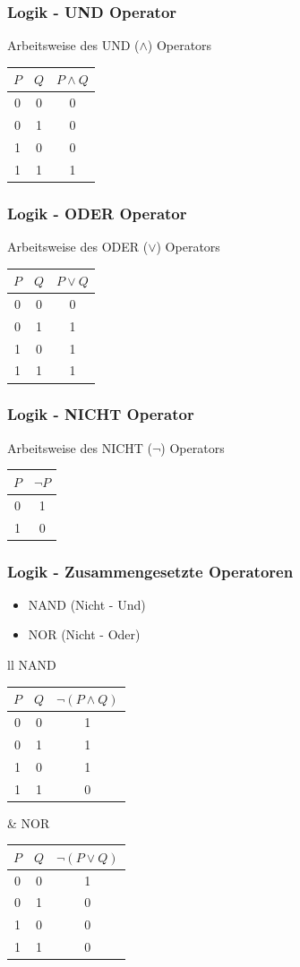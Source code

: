 \documentclass{beamer}
\begin{document}
\frame
{
	\frametitle{Logik - UND Operator}
	Arbeitsweise des UND ($\land$) Operators\\
	\vspace{3mm}
	\begin{tabular}{c|c|c}
	$P$ & $Q$ & $P \land Q$ \\
	\hline
	0 & 0 & 0 \\
	0 & 1 & 0 \\
	1 & 0 & 0 \\
	1 & 1 & 1
	\end{tabular}
}

\frame
{
	\frametitle{Logik - ODER Operator}
	Arbeitsweise des ODER ($\lor$) Operators\\
	\vspace{3mm}
	\begin{tabular}{c|c|c}
	$P$ & $Q$ & $P \lor Q$ \\
	\hline
	0 & 0 & 0 \\
	0 & 1 & 1 \\
	1 & 0 & 1 \\
	1 & 1 & 1
	\end{tabular}
}

\frame
{
	\frametitle{Logik - NICHT Operator}
	Arbeitsweise des NICHT ($\lnot$) Operators\\
	\vspace{3mm}
	\begin{tabular}{c|c}
	$P$ & $\lnot P$ \\
	\hline
	0 & 1 \\
	1 & 0
	\end{tabular}
}

\frame
{
	\frametitle{Logik - Zusammengesetzte Operatoren}
	\begin{itemize}
    \item NAND (Nicht - Und)
    \item NOR (Nicht - Oder)
    \end{itemize}
    \begin{tabular}{ll}
    NAND
    \begin{tabular}{c|c|c}
	$P$ & $Q$ & $\lnot(P \land Q)$ \\
	\hline
	0 & 0 & 1 \\
	0 & 1 & 1 \\
	1 & 0 & 1 \\
	1 & 1 & 0
	\end{tabular}
    &
    NOR
    \begin{tabular}{c|c|c}
	$P$ & $Q$ & $\lnot(P \lor Q)$ \\
	\hline
	0 & 0 & 1 \\
	0 & 1 & 0 \\
	1 & 0 & 0 \\
	1 & 1 & 0
	\end{tabular}
    \end{tabular}
}
\end{document}

